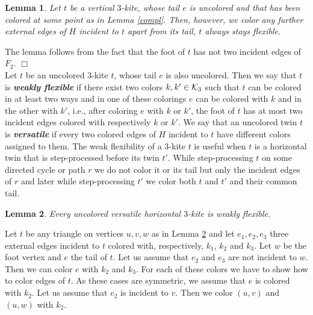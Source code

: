 \documentclass[a4, 11pt]{article}
\newcommand{\dowod}{\noindent{\bf Proof.~}}
\newcommand{\koniec}{\hfill $\Box$\\[.1ex]}
\newcommand{\<}{\langle}
\renewcommand{\>}{\rangle}
\newcommand{\Kt}{{\cal K}_3}
\newtheorem{lemma}{Lemma}
\begin{document}
\begin{lemma} \label{ver1}
Let $t$ be a vertical $3$-kite, whose tail $e$ is uncolored and that has been colored at some point as in Lemma \ref{compl}. Then, however, we color any further  external edges of $H$ incident to $t$ apart from its tail, $t$ always stays flexible.
\end{lemma}
\dowod The lemma follows from the fact that the foot of $t$ has not two incident edges of $F_2$. \koniec
 
Let $t$ be an uncolored $3$-kite $t$, whose tail $e$ is also uncolored. Then we say that $t$ is {\bf \em weakly flexible} if  there exist two colors $k, k' \in \Kt $ such that $t$ can be colored in at least two ways and
in one of these colorings $e$ can be colored with $k$ and in the other with $k'$, i.e., after coloring $e$ with $k$ or $k'$, the foot of $t$ has at most two incident edges colored with respectively $k$ or $k'$.
We say that an uncolored twin $t$ is {\bf \em versatile} if every two colored edges of $H$ incident to $t$ have different colors assigned to them. The weak flexibility of a $3$-kite $t$ is useful when $t$ is a horizontal twin that is step-processed before its twin $t'$.  While step-processing $t$ on some directed cycle or path $r$ we do not color it or its tail but only the incident edges of $r$ and later while step-processing $t'$ we color both $t$ and $t'$ and their common tail.


\begin{lemma} \label{horiz}
Every uncolored versatile horizontal $3$-kite is weakly flexible.
\end{lemma}
\dowod Let $t$ be any triangle on vertices $u,v,w$ as in Lemma \ref{horiz} and let $e_1, e_2, e_3$ three external edges incident to $t$ colored with, respectively, $k_1$, $k_2$ and $k_3$. Let $w$ be the foot vertex and $e$ the tail of $t$. Let us assume that $e_2$ and $e_3$ are not incident to $w$. Then we can color $e$ with $k_2$ and $k_3$. For each of these colors we have to show how to color edges of $t$. As these cases are symmetric, we assume that $e$ is colored with $k_2$. Let us assume that $e_2$ is incident to $v$. Then we color $(u,v)$ and $(u,w)$ with $k_2$.

\begin{figure}[h!] \label{fighoriz}
	\centering

\end{figure}
\end{document}
